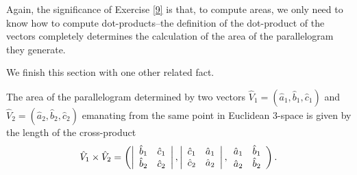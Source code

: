 \documentclass{ximera}
\begin{document}
Again, the significance of Exercise \ref{9} is that, to compute areas, we only
need to know how to compute dot-products--the definition of the dot-product of
the vectors completely determines the calculation of the area of the
parallelogram they generate.

We finish this section with one other related fact.

\begin{lemma}
The area of the parallelogram determined by two vectors $\hat{V}_{1}=\left(
\hat{a}_{1},\hat{b}_{1},\hat{c}_{1}\right)  $ and $\hat{V}_{2}=\left(  \hat
{a}_{2},\hat{b}_{2},\hat{c}_{2}\right)  $ emanating from the same point in
Euclidean $3$-space is given by the length of the cross-product%
\[
\hat{V}_{1}\times\hat{V}_{2}=\left(  \left\vert
\begin{array}
[c]{cc}%
\hat{b}_{1} & \hat{c}_{1}\\
\hat{b}_{2} & \hat{c}_{2}%
\end{array}
\right\vert ,\left\vert
\begin{array}
[c]{cc}%
\hat{c}_{1} & \hat{a}_{1}\\
\hat{c}_{2} & \hat{a}_{2}%
\end{array}
\right\vert ,%
\begin{array}
[c]{cc}%
\hat{a}_{1} & \hat{b}_{1}\\
\hat{a}_{2} & \hat{b}_{2}%
\end{array}
\right)  .
\]

\end{lemma}
\end{document}
